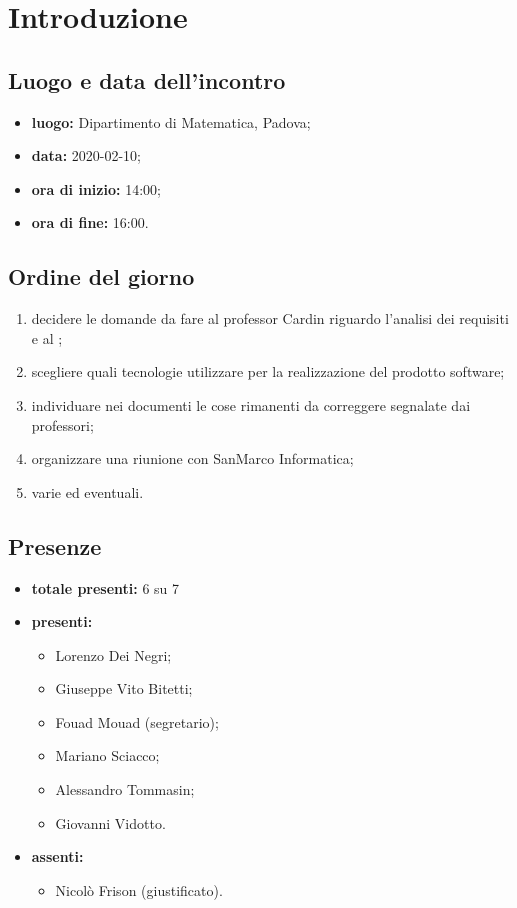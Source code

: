 \section*{Introduzione}

\subsection*{Luogo e data dell'incontro}
	\begin{itemize}
		\item \textbf{luogo:} Dipartimento di Matematica, Padova;
		\item \textbf{data:} 2020-02-10;
		\item \textbf{ora di inizio:} 14:00;
		\item \textbf{ora di fine:} 16:00.
	\end{itemize}

\subsection*{Ordine del giorno}
	\begin{enumerate}
			\item decidere le domande da fare al professor Cardin riguardo l'analisi dei requisiti e al ;
  			\item scegliere quali tecnologie utilizzare per la realizzazione del prodotto software;
  			\item individuare nei documenti le cose rimanenti da correggere segnalate dai professori;
  			\item organizzare una riunione con SanMarco Informatica;
  			\item varie ed eventuali.
	\end{enumerate}

\subsection*{Presenze}
	\begin{itemize}
		\item \textbf{totale presenti:} 6 su 7
		\item \textbf{presenti: }
			\begin{itemize}			
				\item Lorenzo Dei Negri;
				\item Giuseppe Vito Bitetti;
				\item Fouad Mouad (segretario);
				\item Mariano Sciacco;
				\item Alessandro Tommasin;
				\item Giovanni Vidotto.
			\end{itemize}
		\item \textbf{assenti: } 
			\begin{itemize}	
				\item Nicolò Frison (giustificato).
			\end{itemize}
	\end{itemize}


